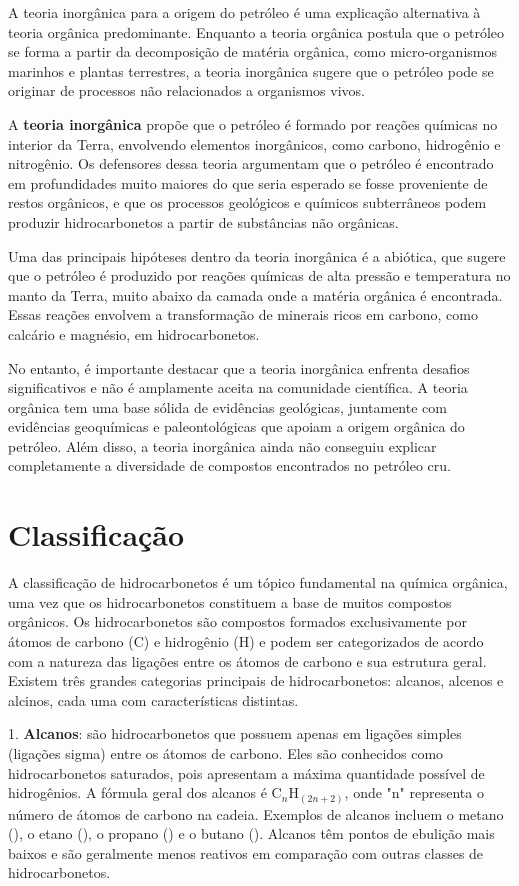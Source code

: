 \documentclass[a4paper,12pt]{book}
\begin{document}
A teoria inorgânica para a origem do petróleo é uma explicação alternativa à teoria orgânica predominante. Enquanto a teoria orgânica postula que o petróleo se forma a partir da decomposição de matéria orgânica, como micro-organismos marinhos e plantas terrestres, a teoria inorgânica sugere que o petróleo pode se originar de processos não relacionados a organismos vivos.

A \textbf{teoria inorgânica} propõe que o petróleo é formado por reações químicas no interior da Terra, envolvendo elementos inorgânicos, como carbono, hidrogênio e nitrogênio. Os defensores dessa teoria argumentam que o petróleo é encontrado em profundidades muito maiores do que seria esperado se fosse proveniente de restos orgânicos, e que os processos geológicos e químicos subterrâneos podem produzir hidrocarbonetos a partir de substâncias não orgânicas.

Uma das principais hipóteses dentro da teoria inorgânica é a abiótica, que sugere que o petróleo é produzido por reações químicas de alta pressão e temperatura no manto da Terra, muito abaixo da camada onde a matéria orgânica é encontrada. Essas reações envolvem a transformação de minerais ricos em carbono, como calcário e magnésio, em hidrocarbonetos.

No entanto, é importante destacar que a teoria inorgânica enfrenta desafios significativos e não é amplamente aceita na comunidade científica. A teoria orgânica tem uma base sólida de evidências geológicas, juntamente com evidências geoquímicas e paleontológicas que apoiam a origem orgânica do petróleo. Além disso, a teoria inorgânica ainda não conseguiu explicar completamente a diversidade de compostos encontrados no petróleo cru.

\section{Classificação}
A classificação de hidrocarbonetos é um tópico fundamental na química orgânica, uma vez que os hidrocarbonetos constituem a base de muitos compostos orgânicos. Os hidrocarbonetos são compostos formados exclusivamente por átomos de carbono (C) e hidrogênio (H) e podem ser categorizados de acordo com a natureza das ligações entre os átomos de carbono e sua estrutura geral. Existem três grandes  categorias principais de hidrocarbonetos: alcanos, alcenos e alcinos, cada uma com características distintas.

1. \textbf{Alcanos}: são hidrocarbonetos que possuem apenas em ligações simples (ligações sigma) entre os átomos de carbono. Eles são conhecidos como hidrocarbonetos saturados, pois apresentam a máxima quantidade possível de hidrogênios. A fórmula geral dos alcanos é C{$_n$}H$_{(2n+2)}$, onde "n" representa o número de átomos de carbono na cadeia. Exemplos de alcanos incluem o metano (), o etano (), o propano () e o butano (). Alcanos têm pontos de ebulição mais baixos e são geralmente menos reativos em comparação com outras classes de hidrocarbonetos.
\end{document}
